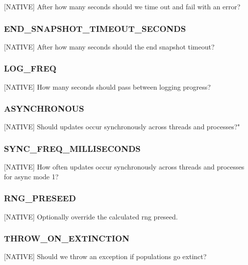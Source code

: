 
[NATIVE] After how many seconds should we time out and fail with an error?

\subsubsection{END\_SNAPSHOT\_TIMEOUT\_SECONDS}


[NATIVE] After how many seconds should the end snapshot timeout?

\subsubsection{LOG\_FREQ}


[NATIVE] How many seconds should pass between logging progress?

\subsubsection{ASYNCHRONOUS}


[NATIVE] Should updates occur synchronously across threads and processes?"

\subsubsection{SYNC\_FREQ\_MILLISECONDS}


[NATIVE] How often updates occur synchronously across threads and processes for async mode 1?

\subsubsection{RNG\_PRESEED}


[NATIVE] Optionally override the calculated rng preseed.

\subsubsection{THROW\_ON\_EXTINCTION}


[NATIVE] Should we throw an exception if populations go extinct?

